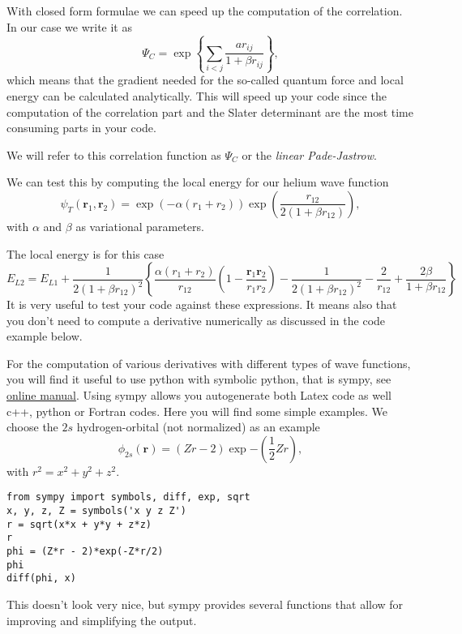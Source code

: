 \documentclass[%
oneside,                 %
final,                   %
10pt]{article}
\begin{document}
With closed form formulae we  can speed up the computation of the correlation. In our case
we write it as 
\[
\Psi_C= \exp{\left\{\sum_{i < j}\frac{ar_{ij}}{1+\beta r_{ij}}\right\}},
\]
which means that the gradient needed for the so-called quantum force and local energy 
can be calculated analytically.
This will speed up your code since the computation of the correlation part and the Slater determinant are the most 
time consuming parts in your code.  

We will refer to this correlation function as $\Psi_C$ or the \emph{linear Pade-Jastrow}.

We can test this by computing the local energy for our helium wave function
\[
   \psi_{T}(\bm{r}_1,\bm{r}_2) = 
   \exp{\left(-\alpha(r_1+r_2)\right)}
   \exp{\left(\frac{r_{12}}{2(1+\beta r_{12})}\right)}, 
\]
with $\alpha$ and $\beta$ as variational parameters.

The local energy is for this case 
\[ 
E_{L2} = E_{L1}+\frac{1}{2(1+\beta r_{12})^2}\left\{\frac{\alpha(r_1+r_2)}{r_{12}}(1-\frac{\bm{r}_1\bm{r}_2}{r_1r_2})-\frac{1}{2(1+\beta r_{12})^2}-\frac{2}{r_{12}}+\frac{2\beta}{1+\beta r_{12}}\right\}
\]
It is very useful to test your code against these expressions. It means also that you don't need to
compute a derivative numerically as discussed in the code example below. 

For the computation of various derivatives with different types of wave functions, you will find it useful to use python with symbolic python, that is sympy, see \href{{http://docs.sympy.org/latest/index.html}}{online manual}.  Using sympy allows you autogenerate both Latex code as well c++, python or Fortran codes. Here you will find some simple examples. We choose 
the $2s$ hydrogen-orbital  (not normalized) as an example
\[
 \phi_{2s}(\bm{r}) = (Zr - 2)\exp{-(\frac{1}{2}Zr)},
\]
with $ r^2 = x^2 + y^2 + z^2$.









\begin{verbatim}
from sympy import symbols, diff, exp, sqrt
x, y, z, Z = symbols('x y z Z')
r = sqrt(x*x + y*y + z*z)
r
phi = (Z*r - 2)*exp(-Z*r/2)
phi
diff(phi, x)

\end{verbatim}

This doesn't look very nice, but sympy provides several functions that allow for improving and simplifying the output.
\end{document}
